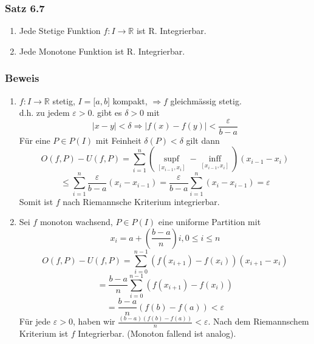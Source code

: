 \subsubsection*{Satz 6.7}
\begin{enumerate}
\item Jede Stetige Funktion $f:I\rightarrow \mathbb{R}$ ist R. Integrierbar.
\item Jede Monotone Funktion ist R. Integrierbar.
\end{enumerate}
\subsubsection*{Beweis}
\begin{enumerate}
\item $f:I\rightarrow\mathbb{R}$ stetig, $I=\lbrack a,b\rbrack$ kompakt, $\Rightarrow f$ gleichmässig stetig.\\
d.h. zu jedem $\varepsilon >0$. gibt es $\delta >0$ mit $$\left| {x - y} \right| < \delta  \Rightarrow \left| {f(x) - f(y)} \right| < \frac{\varepsilon }{{b - a}}$$
Für eine $P\in P(I)$ mit Feinheit $\delta(P)<\delta$ gilt dann $$O(f,P)-U(f,P)=\sum\limits_{i = 1}^n {(\mathop {\sup f}\limits_{[{x_{i - 1}},{x_i}]}  - \mathop {\inf f}\limits_{[{x_{i - 1}},{x_i}]} )} ({x_{i - 1}} - {x_i}) $$$$\le \sum\limits_{i = 1}^n {\frac{\varepsilon }{{b - a}}({x_i} - {x_{i - 1}}) = \frac{\varepsilon }{{b - a}}\sum\limits_{i = 1}^n {({x_i} - {x_{i - 1}})} }  = \varepsilon $$
Somit ist $f$ nach Riemannsche Kriterium integrierbar.

\item Sei $f$ monoton wachsend, $P\in P(I)$ eine uniforme Partition mit $$x_i = a+\left(\frac{b-a}{n}\right)i, 0\leq i \leq n$$
$$O(f,P) - U(f,P) = \sum\limits_{i = 0}^{n - 1} {(f({x_{i + 1}}) - f({x_i}))({x_{i + 1}} - {x_i})} $$$$ = \frac{{b - a}}{n}\sum\limits_{i = 0}^{n - 1} {(f({x_{i + 1}}) - f({x_i}))} $$ $$ = \frac{{b - a}}{n}(f(b) - f(a)) < \varepsilon $$
Für jede $\varepsilon>0$, haben wir $\frac{{(b - a)(f(b) - f(a))}}{n} < \varepsilon$. Nach dem Riemannschem Kriterium ist $f$ Integrierbar. (Monoton fallend ist analog). 
\end{enumerate}

